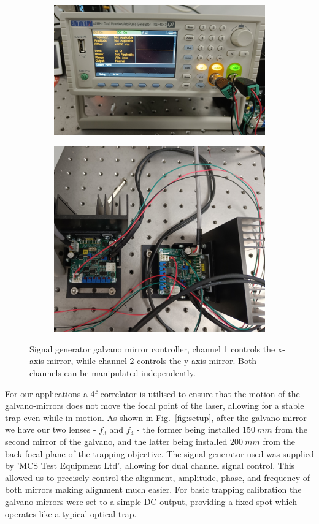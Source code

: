 \begin{figure}[h!]
	\centering
	\begin{subfigure}{0.475\linewidth}
		\includegraphics[width=\linewidth]{signal_generator.jpg}
		\caption{}
	\end{subfigure}
	\begin{subfigure}{0.475\linewidth}
		\includegraphics[width=\linewidth, height=0.7\linewidth]
		{galvano_mirror_controllers.jpg}
		\caption{}
	\end{subfigure}

	\caption{Signal generator galvano mirror controller, channel 1 controls the x-axis 
		mirror, while channel 2 controls the y-axis mirror. Both channels can be manipulated
		independently.}
\end{figure}

For our applications a 4f correlator is utilised to ensure that the motion
of the galvano-mirrors does not move the focal point of the laser, allowing 
for a stable trap even while in motion. As shown in Fig.~\ref{fig:setup}, after
the galvano-mirror we have our two lenses - $f_3$ and $f_4$ - the former being 
installed $150\ mm$ from the second mirror of the galvano, and the latter being 
installed $200\ mm$ from the back focal plane of the trapping objective. The 
signal generator used was supplied by 'MCS Test Equipment Ltd', allowing for 
dual channel signal control. This allowed us to precisely control the alignment,
amplitude, phase, and frequency of both mirrors making alignment much easier. For
basic trapping calibration the galvano-mirrors were set to a simple DC output, 
providing a fixed spot which operates like a typical optical trap.

